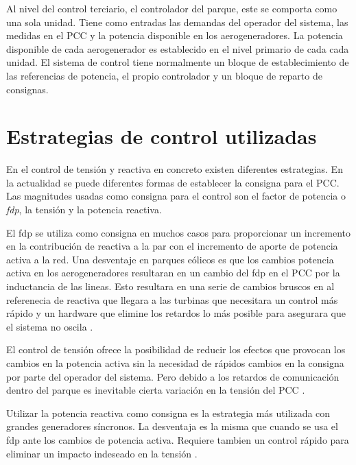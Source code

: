 \documentclass{book}
\begin{document}
Al nivel del control terciario, el controlador del parque, este se comporta como una sola unidad. Tiene como entradas las demandas del operador del sistema, las medidas en el PCC y la potencia disponible en los aerogeneradores. La potencia disponible de cada aerogenerador es establecido en el nivel primario de cada cada unidad. El sistema de control tiene normalmente un bloque de establecimiento de las referencias de potencia, el propio controlador y un bloque de reparto de consignas\cite{DankControl}. \par


	\section{Estrategias de control utilizadas}


En el control de tensi\'on y reactiva en concreto existen diferentes estrategias. En la actualidad se puede diferentes formas de establecer la consigna para el PCC. Las magnitudes usadas como consigna para el control son el factor de potencia o \emph{fdp}, la tensi\'on y la potencia reactiva. \par

El fdp se utiliza como consigna en muchos casos para proporcionar un incremento en la contribuci\'on de reactiva a la par con el incremento de aporte de potencia activa a la red. Una desventaje en parques e\'olicos es que los cambios potencia activa en los aerogeneradores resultaran en un cambio del fdp en el PCC por la inductancia de las lineas. Esto resultara en una serie de cambios bruscos en al referenecia de reactiva que llegara a las turbinas que necesitara un control m\'as r\'apido y un hardware que elimine los retardos lo m\'as posible para asegurara que el sistema no oscila \cite{SPControl}.

El control de tensi\'on ofrece la posibilidad de reducir los efectos que provocan los cambios en la potencia activa sin la necesidad de r\'apidos cambios en la consigna por parte del operador del sistema. Pero debido a los retardos de comunicaci\'on dentro del parque es inevitable cierta variaci\'on en la tensi\'on del PCC \cite{SPControl}. \par

Utilizar la potencia reactiva como consigna es la estrategia m\'as utilizada  con grandes generadores s\'incronos. La desventaja es la misma que cuando se usa el fdp ante los cambios de potencia activa. Requiere tambien un control r\'apido para eliminar un impacto indeseado en la tensi\'on \cite{SPControl}. \par
\end{document}
